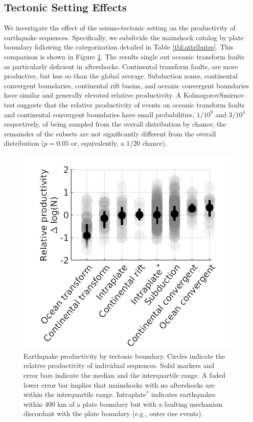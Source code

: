 \documentclass[draft]{agujournal2018}
\begin{document}
    \subsection{Tectonic Setting Effects}\label{sec:tectonic_setting}
    
    We investigate the effect of the seismo-tectonic setting on the productivity of earthquake sequences. Specifically, we subdivide the mainshock catalog by plate boundary following the categorization detailed in Table \ref{tbl:attributes}. This comparison is shown in Figure \ref{fig:plate_boundary}. The results single out oceanic transform faults as particularly deficient in aftershocks. Continental transform faults, are more productive, but less so than the global average. Subduction zones, continental convergent boundaries, continental rift basins, and oceanic convergent boundaries have similar and generally elevated relative productivity. A Kolmogorov\-Smirnov test suggests that the relative productivity of events on oceanic transform faults and continental convergent boundaries have small probabilities, $1/10^9$ and $3/10^4$ respectively, of being sampled from the overall distribution by chance; the remainder of the subsets are not significantly different from the overall distribution ($p = 0.05$ or, equivalently, a  $1/20$ chance).
    
    \begin{figure}
        \centering
        \includegraphics{figures/prod_by_pb.png}
        \caption{Earthquake productivity by tectonic boundary. Circles indicate the relative productivity of individual sequences. Solid markers and error bars indicate the median and the interquartile range. A faded lower error bar implies that mainshocks with no aftershocks are within the interquartile range. Intraplate$^*$ indicates earthquakes within 400 km of a plate boundary but with a faulting mechanism discordant with the plate boundary (e.g., outer rise events).}
        \label{fig:plate_boundary}
    \end{figure}
    
\end{document}

